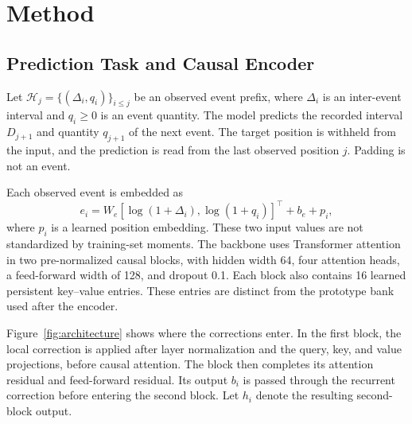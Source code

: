 \documentclass[runningheads]{llncs}
\newcommand{\Hcal}{\mathcal{H}}
\begin{document}
\section{Method}
\subsection{Prediction Task and Causal Encoder}
Let $\Hcal_j=\{(\Delta_i,q_i)\}_{i\leq j}$ be an observed event prefix, where $\Delta_i$ is an inter-event interval and $q_i\geq0$ is an event quantity. The model predicts the recorded interval $D_{j+1}$ and quantity $q_{j+1}$ of the next event. The target position is withheld from the input, and the prediction is read from the last observed position $j$. Padding is not an event.

Each observed event is embedded as
\begin{equation}
 e_i=W_e[\log(1+\Delta_i),\log(1+q_i)]^\top+b_e+p_i,
\end{equation}
where $p_i$ is a learned position embedding. These two input values are not standardized by training-set moments. The backbone uses Transformer attention~\cite{vaswani2017attention} in two pre-normalized causal blocks, with hidden width 64, four attention heads, a feed-forward width of 128, and dropout 0.1. Each block also contains 16 learned persistent key--value entries. These entries are distinct from the prototype bank used after the encoder.

Figure~\ref{fig:architecture} shows where the corrections enter. In the first block, the local correction is applied after layer normalization and the query, key, and value projections, before causal attention. The block then completes its attention residual and feed-forward residual. Its output $b_i$ is passed through the recurrent correction before entering the second block. Let $h_i$ denote the resulting second-block output.
\end{document}

